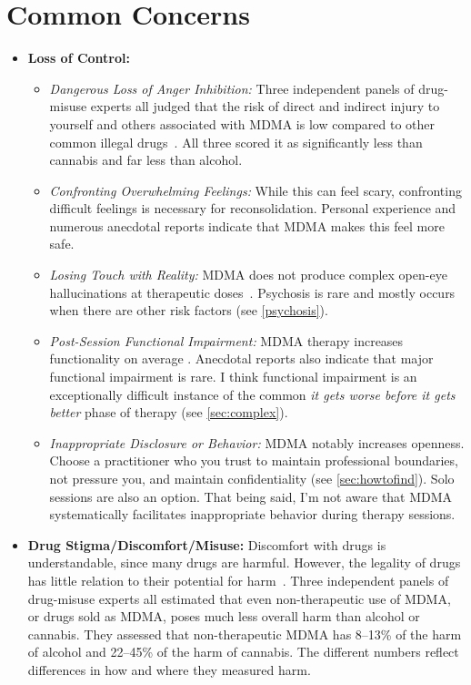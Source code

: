 \documentclass[11pt,oneside]{book}
\let\cite\parencite
\begin{document}
\section{Common Concerns}
\begin{itemize}
    \item \textbf{Loss of Control:}
        \begin{itemize}
            \item \textit{Dangerous Loss of Anger Inhibition:} Three independent panels of drug-misuse experts all judged that the risk of direct and indirect injury to yourself and others associated with MDMA is low compared to other common illegal drugs~\cite{nuttDrugHarms,bonomoHarms,crossinHarms}. All three scored it as significantly less than cannabis and far less than alcohol.
            \item \textit{Confronting Overwhelming Feelings:} While this can feel scary, confronting difficult feelings is necessary for reconsolidation. Personal experience and numerous anecdotal reports indicate that MDMA makes this feel more safe.
            \item \textit{Losing Touch with Reality:} MDMA does not produce complex open-eye hallucinations at therapeutic doses~\cite{liechtiGender}. Psychosis is rare and mostly occurs when there are other risk factors (see \cref{psychosis}).
            \item \textit{Post-Session Functional Impairment:} MDMA therapy increases functionality on average \cite{mitchellMDMAClinicalTrial2,mitchellMDMAClinicalTrial}. Anecdotal reports also indicate that major functional impairment is rare. I think functional impairment is an exceptionally difficult instance of the common \textit{it gets worse before it gets better} phase of therapy (see \cref{sec:complex}).
            \item \textit{Inappropriate Disclosure or Behavior:} MDMA notably increases openness. Choose a practitioner who you trust to maintain professional boundaries, not pressure you, and maintain confidentiality (see \cref{sec:howtofind}). Solo sessions are also an option. That being said, I'm not aware that MDMA systematically facilitates inappropriate behavior during therapy sessions.
        \end{itemize}
    \item \textbf{Drug Stigma/Discomfort/Misuse:}
        Discomfort with drugs is understandable, since many drugs are harmful. However, the legality of drugs has little relation to their potential for harm~\cite{nuttDrugHarms,bonomoHarms,crossinHarms}. Three independent panels of drug-misuse experts all estimated that even non-therapeutic use of MDMA, or drugs sold as MDMA, poses much less overall harm than alcohol or cannabis. They assessed that non-therapeutic MDMA has 8--13\% of the harm of alcohol and 22--45\% of the harm of cannabis. The different numbers reflect differences in how and where they measured harm.

\end{itemize}
\end{document}

